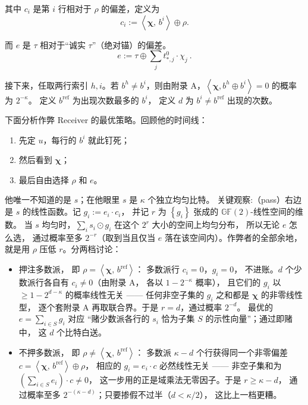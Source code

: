 其中 $c_i$ 是第 $i$ 行相对于 $\rho$ 的偏差，定义为
\begin{equation}\label{eq:02-kos15:17}
c_i := \left<\boldsymbol{\chi},\, b^i\right> \oplus \rho.
\end{equation}

而 $e$ 是 $\tau$ 相对于“诚实 $\tau$”（绝对锚）的偏差。
\begin{equation}\label{eq:02-kos15:18}
e := \tau \oplus \sum_j t^0_{*,j} \cdot \chi_j ~.
\end{equation}

接下来，任取两行索引 $h, i$。若 $b^h\ne b^i$，则由附录
A，$\left<\boldsymbol\chi, b^h\oplus b^i\right>=0$ 的概率为 $2^{-\kappa}$。
定义 $b^{\mathrm{ref}}$ 为出现次数最多的 $b^i$，
定义 $d$ 为 $b^i\ne b^\mathrm{ref}$ 出现的次数。

下面分析作弊 Receiver 的最优策略。回顾他的时间线：

\begin{enumerate}
\def\labelenumi{\arabic{enumi}.}

\item
  先定 $u$，每行的 $b^i$ 就此钉死；
\item
  然后看到 $\boldsymbol{\chi}$；
\item
  最后自由选择 $\rho$ 和 $e$。
\end{enumerate}

他唯一不知道的是 $s$；在他眼里 $s$ 是 $\kappa$ 个独立均匀比特。
关键观察:（pass）右边是 $s$ 的线性函数。记 $g_i := e_i \cdot c_i$，
并记 $r$ 为 $\left\{g_i\right\}$ 张成的 $\mathbb{GF}(2)$-线性空间的维数。
当 $s$ 均匀时，$\sum_i s_i \odot g_i$ 在这个 $2^r$ 大小的空间上均匀分布，
所以无论 $e$ 怎么选，
通过概率至多 $2^{-r}$（取到当且仅当 $e$ 落在该空间内）。作弊者的全部余地，
就是用 $\rho$ 压低 $r$。分两档讨论：

\begin{itemize}

\item
  押注多数派，
  即 $\rho = \left<\boldsymbol{\chi},\, b^{\mathrm{ref}}\right>$：
  多数派行 $c_i = 0$，$g_i = 0$，
  不进账。$d$ 个少数派行各自有 $c_i \ne 0$（由附录 A，
  各以 $1 - 2^{-\kappa}$ 概率），
  且它们的 $g_i$ 以 $\ge 1 - 2^{d-\kappa}$ 的概率线性无关 ------
  任何非空子集的 $g_i$ 之和都是 $\boldsymbol{\chi}$ 的非零线性型，
  逐个套附录 A 再取联合界。于是 $r = d$，通过概率 $2^{-d}$。
  最优的 $e = \sum_{i \in S} g_i$ 对应
“赌少数派各行的 $s_i$ 恰为子集 $S$ 的示性向量”；通过即赌中，
  这 $d$ 个比特白送。
\item
  不押多数派，
  即 $\rho \ne \left<\boldsymbol{\chi},\, b^{\mathrm{ref}}\right>$：
  多数派 $\kappa - d$ 个行获得同一个非零偏差 $c = \left<\boldsymbol{\chi},\, b^{\mathrm{ref}}\right> \oplus \rho$，
  相应的 $g_i = e_i \cdot c$ 必然线性无关 ------
  非空子集和为 $\left(\sum_{i \in S} e_i\right) \cdot c \ne 0$，
  这一步用的正是域乘法无零因子。于是 $r \ge \kappa - d$，
  通过概率至多 $2^{-(\kappa - d)}$；只要掺假不过半（$d < \kappa/2$），
  这比上一档更糟。
\end{itemize}

